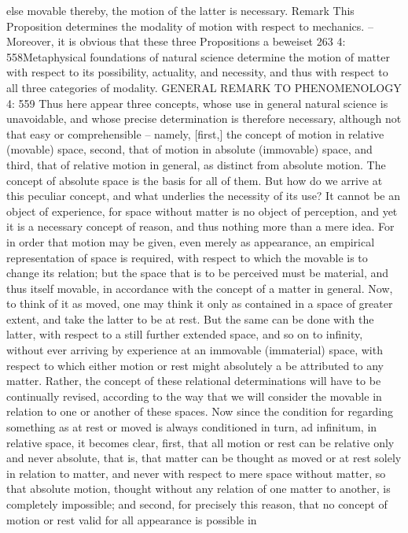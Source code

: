else movable thereby, the motion of the latter is necessary.
Remark
This Proposition determines the modality of motion with respect to
mechanics. – Moreover, it is obvious that these three Propositions
a
beweiset
263
4: 558Metaphysical foundations of natural science
determine the motion of matter with respect to its possibility, actuality,
and necessity, and thus with respect to all three categories of modality.
GENERAL REMARK TO PHENOMENOLOGY
4: 559
Thus here appear three concepts, whose use in general natural science
is unavoidable, and whose precise determination is therefore necessary,
although not that easy or comprehensible – namely, [ﬁrst,] the concept
of motion in relative (movable) space, second, that of motion in absolute
(immovable) space, and third, that of relative motion in general, as distinct
from absolute motion. The concept of absolute space is the basis for all of
them. But how do we arrive at this peculiar concept, and what underlies
the necessity of its use?
It cannot be an object of experience, for space without matter is no
object of perception, and yet it is a necessary concept of reason, and
thus nothing more than a mere idea. For in order that motion may be
given, even merely as appearance, an empirical representation of space
is required, with respect to which the movable is to change its relation;
but the space that is to be perceived must be material, and thus itself
movable, in accordance with the concept of a matter in general. Now,
to think of it as moved, one may think it only as contained in a space
of greater extent, and take the latter to be at rest. But the same can be
done with the latter, with respect to a still further extended space, and
so on to inﬁnity, without ever arriving by experience at an immovable
(immaterial) space, with respect to which either motion or rest might
absolutely a be attributed to any matter. Rather, the concept of these
relational determinations will have to be continually revised, according
to the way that we will consider the movable in relation to one or another
of these spaces. Now since the condition for regarding something as at
rest or moved is always conditioned in turn, ad inﬁnitum, in relative space,
it becomes clear, ﬁrst, that all motion or rest can be relative only and never
absolute, that is, that matter can be thought as moved or at rest solely in
relation to matter, and never with respect to mere space without matter,
so that absolute motion, thought without any relation of one matter to
another, is completely impossible; and second, for precisely this reason,
that no concept of motion or rest valid for all appearance is possible in
